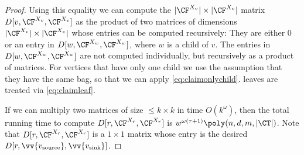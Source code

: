 \begin{proof}
Using this equality we can compute the $|\CF^{X_v}|\times|\CF^{X_v}|$ matrix $D[v,\CF^{X_v},\CF^{X_v}]$ as the product of two matrices of dimensions $|\CF^{X_v}|\times|\CF^{X_v}|$ whose entries can be computed recursively: They are either 0 or an entry in $D[w,\CF^{X_w},\CF^{X_w}]$, where $w$ is a child of $v$. The entries in $D[w,\CF^{X_w},\CF^{X_w}]$ are not computed individually, but recursively as a product of matrices.
For vertices that have only one child we use the assumption that they have the same bag, so that we can apply \eqref{eq:claimonlychild}. leaves are treated via \eqref{eq:claimleaf}.

If we can multiply two matrices of size $\leq k \times k$ in time $O(k^\omega)$, then the total running time to compute $D[r,\CF^{X_r},\CF^{X_r}]$ is $w^{\omega(\tau+1)}\poly(n,d,m, |\CT|)$. Note that $D[r,\CF^{X_r},\CF^{X_r}]$ is a $1 \times 1$ matrix whose entry is the desired $D[r,\vv{v_{\textup{source}}}, \vv{v_{\textup{sink}}}]$.
\end{proof}

%
%
%
%
%
%
%
%
%
%
%
%
%
%
%
%
%
%
%
%
%
%
%
%
%
%
%
%
%
%
%
%
%
%
%
%
%
%
%
%
%
%
%
%
%
%
%
%
%
%
%
%
%
%
%
%
%
%
%
%
%
%
%
%
%
%
%
%
%
%
%
%
%
%
%
%
%
%
%
%
%
%
%
%
%
%
%
%
%
%
%
%
%
%
%
%
%
%

